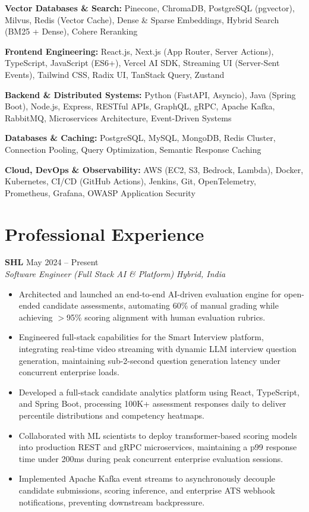 \documentclass[10pt,a4paper]{article}
\newcommand{\jobheading}[4]{
  \textbf{#1} \hfill #2\\
  \textit{#3} \hfill \textit{#4}\\[-2pt]
}
\begin{document}
\textbf{Vector Databases \& Search:}
Pinecone, ChromaDB, PostgreSQL (pgvector), Milvus, Redis (Vector Cache), Dense \& Sparse Embeddings, Hybrid Search (BM25 + Dense), Cohere Reranking

\textbf{Frontend Engineering:}
React.js, Next.js (App Router, Server Actions), TypeScript, JavaScript (ES6+), Vercel AI SDK, Streaming UI (Server-Sent Events), Tailwind CSS, Radix UI, TanStack Query, Zustand

\textbf{Backend \& Distributed Systems:}
Python (FastAPI, Asyncio), Java (Spring Boot), Node.js, Express, RESTful APIs, GraphQL, gRPC, Apache Kafka, RabbitMQ, Microservices Architecture, Event-Driven Systems

\textbf{Databases \& Caching:}
PostgreSQL, MySQL, MongoDB, Redis Cluster, Connection Pooling, Query Optimization, Semantic Response Caching

\textbf{Cloud, DevOps \& Observability:}
AWS (EC2, S3, Bedrock, Lambda), Docker, Kubernetes, CI/CD (GitHub Actions), Jenkins, Git, OpenTelemetry, Prometheus, Grafana, OWASP Application Security


\section{Professional Experience}

\jobheading
  {SHL}
  {May 2024 -- Present}
  {Software Engineer (Full Stack AI \& Platform)}
  {Hybrid, India}

\begin{itemize}
  \item Architected and launched an end-to-end AI-driven evaluation engine for open-ended candidate assessments, automating 60\% of manual grading while achieving $>$95\% scoring alignment with human evaluation rubrics.
  \item Engineered full-stack capabilities for the Smart Interview platform, integrating real-time video streaming with dynamic LLM interview question generation, maintaining sub-2-second question generation latency under concurrent enterprise loads.
  \item Developed a full-stack candidate analytics platform using React, TypeScript, and Spring Boot, processing 100K+ assessment responses daily to deliver percentile distributions and competency heatmaps.
  \item Collaborated with ML scientists to deploy transformer-based scoring models into production REST and gRPC microservices, maintaining a p99 response time under 200ms during peak concurrent enterprise evaluation sessions.
  \item Implemented Apache Kafka event streams to asynchronously decouple candidate submissions, scoring inference, and enterprise ATS webhook notifications, preventing downstream backpressure.
\end{itemize}
\end{document}
